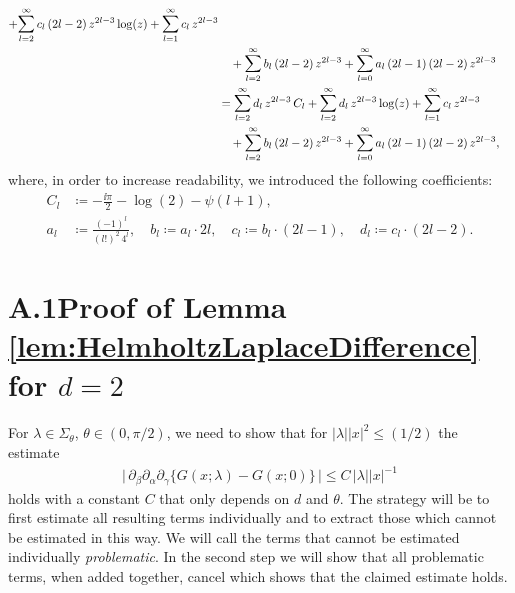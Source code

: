 \begin{align*}
  +  \mathlarger{\sum}_{l = 2}^\infty \, c_l \, (2l - 2) \, z^{2l - 3} \log(z) 
  +  \mathlarger{\sum}_{l = 1}^\infty \, c_l \, z^{2l - 3} \\
 &\quad  
  + \mathlarger{\sum}_{l = 2}^\infty \, b_l \, (2l - 2) \, z^{2l - 3} 
  + \mathlarger{\sum}_{l = 0}^\infty \, a_l \, (2l - 1) \, (2l - 2) \, z^{2l - 3} \\
  &= \mathlarger{\sum}_{l = 2}^\infty \, d_l \, z^{2l - 3} \, C_l 
  + \mathlarger{\sum}_{l = 2}^\infty \, d_l \, z^{2l - 3} \log(z) 
  + \mathlarger{\sum}_{l = 1}^\infty \, c_l \, z^{2l - 3} \\
 &\quad  + \mathlarger{\sum}_{l = 2}^\infty \, b_l \, (2l - 2) \, z^{2l - 3} 
  + \mathlarger{\sum}_{l = 0}^\infty \, a_l \, (2l - 1)\, (2l - 2) \, z^{2l - 3} ,
\end{align*}
where, in order to increase readability, we introduced the following coefficients:
\begin{align*}
  C_l &\coloneqq -\frac{\ii \pi}{2} - \log(2) - \psi(l + 1), \\
  a_l &\coloneqq \frac{(-1)^l}{(l!)^2 \, 4^l}, \quad
  b_l \coloneqq a_l \cdot  2l, \quad
  c_l \coloneqq b_l \cdot (2l - 1), \quad
  d_l \coloneqq c_l \cdot (2l - 2).
\end{align*}

\section*{A.1\quad Proof of Lemma \ref{lem:HelmholtzLaplaceDifference} for $d = 2$}
\label{sec:A1}

For $\lambda \in \Sigma_\theta$, $\theta \in (0, \pi/2)$, we need to show that for $|\lambda| |x|^2 \leq (1/2)$ the estimate
\begin{align*}
  \Big|\, \partial_\beta \partial_\alpha \partial_\gamma \big\{ G(x; \lambda) - G(x; 0) \big\} \, \Big|
  \leq C\, |\lambda| |x|^{-1}
\end{align*}
holds with a constant $C$ that only depends on $d$ and $\theta$.
The strategy will be to first estimate all resulting terms individually and to extract those which cannot be estimated in this way.
We will call the terms that cannot be estimated individually \emph{problematic}.
In the second step we will show that all problematic terms, when added together, cancel which shows that the claimed estimate holds.

